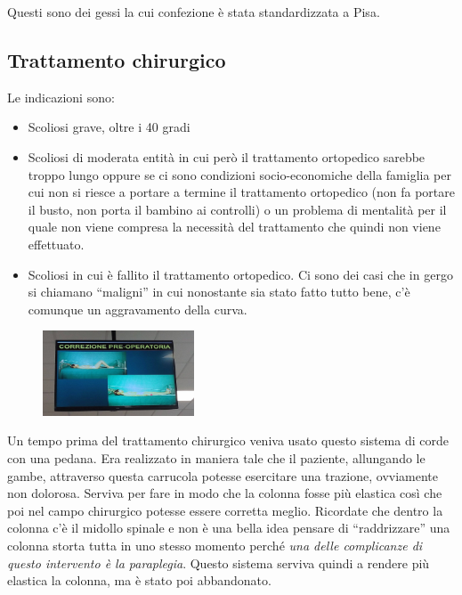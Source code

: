 Questi sono dei gessi la cui confezione è stata standardizzata a Pisa.

\subsection{Trattamento chirurgico}

Le indicazioni sono:

\begin{itemize}
\item
  Scoliosi grave, oltre i 40 gradi
\item
  Scoliosi di moderata entità in cui però il trattamento ortopedico sarebbe troppo lungo oppure se ci sono condizioni socio-economiche della famiglia per cui non si riesce a portare a termine il trattamento ortopedico (non fa portare il busto, non porta il bambino ai controlli) o un problema di mentalità per il quale non viene compresa la necessità del trattamento che quindi non viene effettuato.
\item
  Scoliosi in cui è fallito il trattamento ortopedico. Ci sono dei casi che in gergo si chiamano ``maligni'' in cui nonostante sia stato fatto tutto bene, c'è comunque un aggravamento della curva.
\end{itemize}

\begin{figure}[!ht]
\centering
\includegraphics[width=0.4\textwidth]{013/image10.jpeg}
\end{figure}

Un tempo prima del trattamento chirurgico veniva usato questo sistema di corde con una pedana. Era realizzato in maniera tale che il paziente, allungando le gambe, attraverso questa carrucola potesse esercitare una trazione, ovviamente non dolorosa. Serviva per fare in modo che la colonna fosse più elastica così che poi nel campo chirurgico potesse essere corretta meglio. Ricordate che dentro la colonna c'è il midollo spinale e non è una bella idea pensare di ``raddrizzare'' una colonna storta tutta in uno stesso momento perché \emph{una delle complicanze di questo intervento è la paraplegia}. Questo sistema serviva quindi a rendere più elastica la colonna, ma è stato poi abbandonato.

